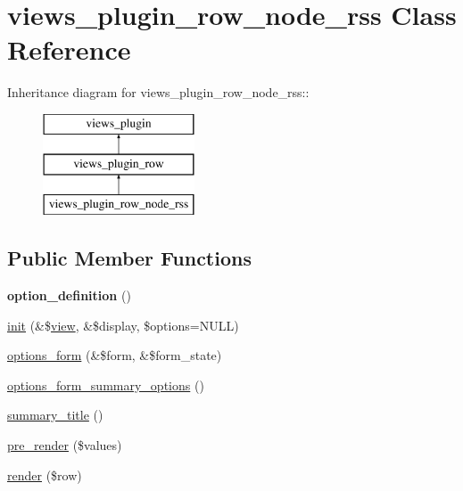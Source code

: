 \hypertarget{classviews__plugin__row__node__rss}{
\section{views\_\-plugin\_\-row\_\-node\_\-rss Class Reference}
\label{classviews__plugin__row__node__rss}
}
Inheritance diagram for views\_\-plugin\_\-row\_\-node\_\-rss::\begin{figure}[H]
\begin{center}
\leavevmode
\includegraphics[height=3cm]{classviews__plugin__row__node__rss}
\end{center}
\end{figure}
\subsection*{Public Member Functions}
\begin{DoxyCompactItemize}
\item 
\hypertarget{classviews__plugin__row__node__rss_a160237bd0d2f6ee0e9c22cf7d08d8082}{
{\bfseries option\_\-definition} ()}
\label{classviews__plugin__row__node__rss_a160237bd0d2f6ee0e9c22cf7d08d8082}

\item 
\hyperlink{classviews__plugin__row__node__rss_a6abed6bfad84d5caca74f5dba8911437}{init} (\&\$\hyperlink{classview}{view}, \&\$display, \$options=NULL)
\item 
\hyperlink{classviews__plugin__row__node__rss_a074125b7562bb918124c2dae6322f58e}{options\_\-form} (\&\$form, \&\$form\_\-state)
\item 
\hyperlink{classviews__plugin__row__node__rss_a266e0776cfa7c86a98453b59215da8aa}{options\_\-form\_\-summary\_\-options} ()
\item 
\hyperlink{classviews__plugin__row__node__rss_a02990378bdbc80b7b20ec6d520ca34e9}{summary\_\-title} ()
\item 
\hyperlink{classviews__plugin__row__node__rss_a1306492166ea78aa60c5e199e5299260}{pre\_\-render} (\$values)
\item 
\hyperlink{classviews__plugin__row__node__rss_a94b9baa2d0a6e196f3da863cf1784343}{render} (\$row)
\end{DoxyCompactItemize}
